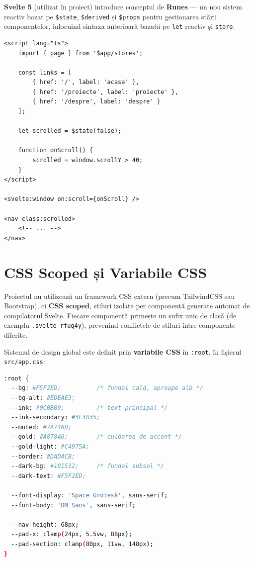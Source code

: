 \documentclass[12pt,a4paper]{report}
\begin{document}
\textbf{Svelte 5} (utilizat în proiect) introduce conceptul de \textbf{Runes}
--- un nou sistem reactiv bazat pe \texttt{\$state}, \texttt{\$derived} și
\texttt{\$props} pentru gestionarea stării componentelor, înlocuind sintaxa
anterioară bazată pe \texttt{let} reactiv și \texttt{store}.

\begin{lstlisting}[language=Svelte,
  caption={Exemplu de Runes Svelte 5 în componenta Navbar}]
<script lang="ts">
    import { page } from '$app/stores';

    const links = [
        { href: '/', label: 'acasa' },
        { href: '/proiecte', label: 'proiecte' },
        { href: '/despre', label: 'despre' }
    ];

    let scrolled = $state(false);

    function onScroll() {
        scrolled = window.scrollY > 40;
    }
</script>

<svelte:window on:scroll={onScroll} />

<nav class:scrolled>
    <!-- ... -->
</nav>
\end{lstlisting}

\section{CSS Scoped și Variabile CSS}

Proiectul nu utilizează un framework CSS extern (precum TailwindCSS sau
Bootstrap), ci \textbf{CSS scoped}, stiluri izolate per componentă generate
automat de compilatorul Svelte. Fiecare componentă primește un sufix unic de
clasă (de exemplu \texttt{.svelte-rfuq4y}), prevenind conflictele de stiluri
între componente diferite.

Sistemul de design global este definit prin \textbf{variabile CSS} în
\texttt{:root}, în fișierul \texttt{src/app.css}:

\begin{lstlisting}[language=bash,
  caption={Variabilele CSS globale ale sistemului de design}]
:root {
  --bg: #F5F2ED;          /* fundal cald, aproape alb */
  --bg-alt: #EDEAE3;
  --ink: #0C0B09;         /* text principal */
  --ink-secondary: #3E3A35;
  --muted: #7A746D;
  --gold: #A87840;        /* culoarea de accent */
  --gold-light: #C4975A;
  --border: #DAD4CB;
  --dark-bg: #181512;     /* fundal subsol */
  --dark-text: #F5F2ED;

  --font-display: 'Space Grotesk', sans-serif;
  --font-body: 'DM Sans', sans-serif;

  --nav-height: 68px;
  --pad-x: clamp(24px, 5.5vw, 88px);
  --pad-section: clamp(80px, 11vw, 148px);
}
\end{lstlisting}
\end{document}
